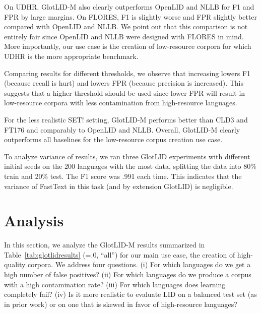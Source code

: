 \documentclass[11pt]{article}
\newcommand{\baseex}{SET!\xspace}
\def\modelname{\mbox{GlotLID-M}\xspace}
\def\flores{FLORES\xspace}
\def\udhr{UDHR\xspace}
\def\ft176{FT176\xspace}
\def\edin{OpenLID\xspace}
\def\nllb{NLLB\xspace}
\def\tabref#1{Table~\ref{tab:#1}}
\def\seclabel#1{\label{sec:#1}\label{p:#1}}
\begin{document}
On \udhr, \modelname also clearly outperforms \edin
and \nllb for F1 and FPR by large margins. On \flores, F1 is
slightly worse and FPR slightly better compared with \edin
and \nllb.
We point out that this comparison is not entirely
fair since \edin and \nllb were designed with \flores in
mind. More
importantly, our use case is the creation of low-resource
corpora for which \udhr is the more appropriate benchmark.

Comparing results for different
thresholds, we observe
that increasing   lowers F1 (because
recall is hurt) and lowers FPR (because precision is increased).
This suggests that a higher threshold should be used since
lower FPR will result in low-resource corpora with less
contamination from high-resource languages.


For the less realistic \baseex setting,
\modelname performs better than CLD3 and \ft176 and
comparably to \edin and \nllb. 
Overall, \modelname  clearly outperforms all baselines
for the low-resource corpus creation use case.



To analyze variance of results, we ran
three GlotLID experiments with different initial seeds
on the 200 languages with the most data, splitting the data
into 80\% train and 20\% test. The F1 score was .991 each
time. This indicates that the variance of FastText in this task (and by
extension GlotLID) is negligible.

\section{Analysis}
\seclabel{analysis}

In this section, we analyze
the \modelname
results summarized
in \tabref{glotlidresults}
(=.0, ``all'')
for our
main use case, the creation of high-quality
corpora. We address four questions. (i) For which languages
do we get a high  number of false positives? (ii)
For which languages do we produce a corpus with a high
contamination rate?
(iii) For which
languages does learning completely fail? (iv)
Is it more realistic to evaluate LID on a balanced test set
(as in prior work) or on one that is skewed in favor
of high-resource languages?
\end{document}
